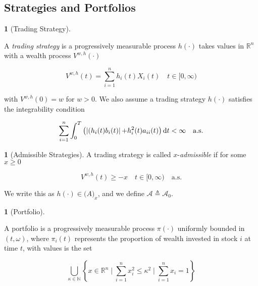 \documentclass[british]{amsart}
\numberwithin{equation}{section}
\numberwithin{figure}{section}
\theoremstyle{plain}
\theoremstyle{definition}
\newtheorem{defn}[thm]{\protect\definitionname}
\theoremstyle{plain}
\theoremstyle{plain}
\theoremstyle{plain}
\theoremstyle{remark}
\theoremstyle{plain}
\providecommand{\definitionname}{Definition}
\renewcommand{\d}[1]{\mathop{\mathrm{d}{#1}}}
\newcommand{\ranget}{t\in[0,\infty)}
\newcommand{\defeq}{\mathop{\triangleq}}
\newcommand{\almostsurely}{\text{a.s.}}
\begin{document}
\subsection{Strategies and Portfolios}

\begin{defn} [Trading Strategy]
	\label{def:tradingstrategy}

	A \textit{trading strategy} is a progressively measurable process $h(\cdot)$ 
	takes values in $\mathbb{R}^{n}$ with a wealth process $V^{w,h}(\cdot)$ 

	\begin{equation*}
		V^{w,h}(t) = \sum_{i=1}^{n} h_{i}(t) X_{i}(t) 
		\quad \ranget
	\end{equation*}

	with $V^{w,h}(0)=w$ for $w > 0$. We also assume a trading strategy $h(\cdot)$  
	satisfies the integrability condition

	\begin{equation*}
		\sum_{i=1}^{n} \int_{0}^{T} 
		\left(
		\abs{(h_{i}(t)b_{i}(t)} + h_{i}^2(t)a_{ii}(t)
			\right) \d{t} < \infty
		\quad	\almostsurely
	\end{equation*}

\end{defn}

\begin{defn} [Admissible Strategies]

	A trading strategy is called $x$-\textit{admissible} if for some $x \ge 0$

	\begin{equation*}
		V^{w,h}(t) \ge -x
		\quad \ranget
		\quad \almostsurely
	\end{equation*}

	We write this as $h(\cdot) \in \mathcal(A)_{x}$, and we define 
	$\mathcal{A} \defeq \mathcal{A}_{0}$.

\end{defn}

\begin{defn} [Portfolio]
	\label{def:portfolio}

	A portfolio is a progressively measurable process $\pi(\cdot)$ uniformly bounded in 
	$(t,\omega)$,	where $\pi_{i}(t)$ represents the proportion of wealth invested in stock 
	$i$ at time $t$, with values is the set

	\begin{equation}
		\bigcup_{\kappa \in \mathbb{N}} 
		\left\{ 
			x \in \mathbb{R}^{n} \mid 
			\sum_{i=1}^{n} x_{i}^2 \le \kappa^2 \mid
			\sum_{i=1}^{n} x_{i} = 1
		\right\} 
	\end{equation}
\end{defn}
\end{document}
